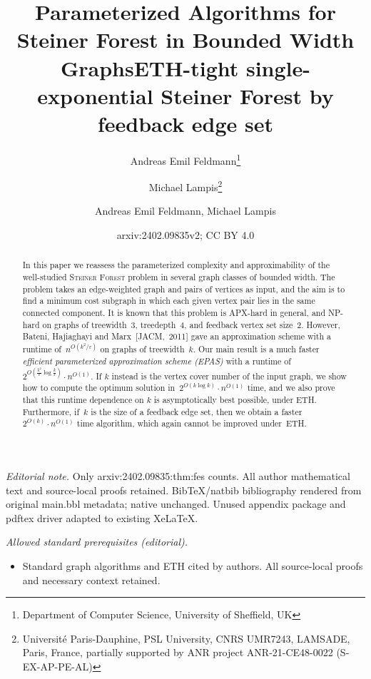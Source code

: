 \documentclass[a4paper]{article}
\title{Parameterized Algorithms for\\
Steiner Forest in Bounded Width Graphs}
\author{Andreas Emil Feldmann\thanks{Department of Computer Science, University 
of Sheffield, UK}
\and
Michael Lampis\thanks{Universit\'{e} Paris-Dauphine, PSL University, CNRS 
UMR7243, LAMSADE, Paris, France, partially supported by ANR project 
ANR-21-CE48-0022 (S-EX-AP-PE-AL)}
}
\date{}
\title{ETH-tight single-exponential Steiner Forest by feedback edge set}
\author{Andreas Emil Feldmann, Michael Lampis}
\date{arxiv:2402.09835v2; CC BY 4.0}
\theoremstyle{plain}
\newcommand{\eps}{{\varepsilon}}
\newcommand{\pname}[1]{\textsc{#1}}
\newcommand{\SF}{\pname{Steiner Forest}\xspace}
\begin{document}
\maketitle
\noindent\textit{Editorial note.} Only arxiv:2402.09835:thm:fes counts. All author mathematical text and source-local proofs retained. BibTeX/natbib bibliography rendered from original main.bbl metadata; native unchanged. Unused appendix package and pdftex driver adapted to existing XeLaTeX.\par\medskip
\noindent\textit{Allowed standard prerequisites (editorial).}\begin{itemize}
\item Standard graph algorithms and ETH cited by authors. All source-local proofs and necessary context retained.
\end{itemize}\medskip

\maketitle
%

\begin{abstract}

In this paper we reassess the parameterized complexity and approximability of
the well-studied \SF problem in several graph classes of bounded width. The
problem takes an edge-weighted graph and pairs of vertices as input, and the
aim is to find a minimum cost subgraph in which each given vertex pair lies in
the same connected component.  It is known that this problem is APX-hard in
general, and NP-hard on graphs of treewidth~3, treedepth~4, and feedback vertex
set size~2. However, Bateni, Hajiaghayi and Marx~[JACM,~2011] gave an approximation scheme
with a runtime of~$n^{O(k^2/\eps)}$ on graphs of treewidth~$k$. Our main result
is a much faster \emph{efficient parameterized approximation scheme (EPAS)}
with a runtime of~$2^{O(\frac{k^2}{\eps}\log\frac{k}{\eps})}\cdot n^{O(1)}$. If
$k$ instead is the vertex cover number of the input graph, we show how to
compute the optimum solution in~$2^{O(k\log k)}\cdot n^{O(1)}$ time, and we
also prove that this runtime dependence on $k$ is asymptotically best possible,
under ETH.  Furthermore, if~$k$ is the size of a feedback edge set, then we
obtain a faster~$2^{O(k)}\cdot n^{O(1)}$ time algorithm, which again cannot be
improved under~ETH.

\end{abstract}

%
%
%
%
%
%
%
%
%
%
%
%
%
%
%
%
%
\end{document}
